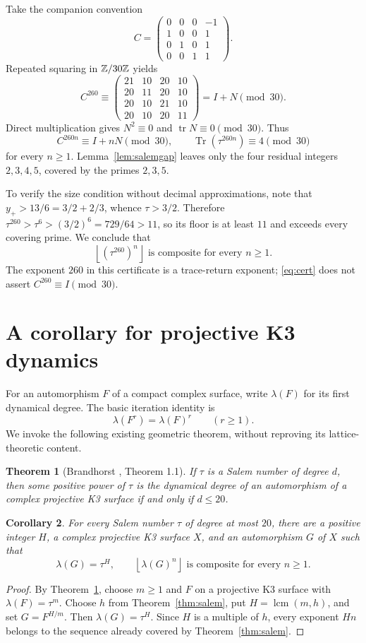 \documentclass[11pt,a4paper]{article}
\newtheorem{theorem}{Theorem}[section]
\newtheorem{corollary}[theorem]{Corollary}
\theoremstyle{definition}\newtheorem{definition}[theorem]{Definition}
\theoremstyle{remark}\newtheorem{remark}[theorem]{Remark}
\DeclareMathOperator{\Tr}{Tr}\DeclareMathOperator{\Norm}{N}\DeclareMathOperator{\trdeg}{trdeg}\DeclareMathOperator{\ord}{ord}\DeclareMathOperator{\lcm}{lcm}
\newcommand{\floor}[1]{\left\lfloor #1\right\rfloor}\newcommand{\ceil}[1]{\left\lceil #1\right\rceil}
\begin{document}
Take the companion convention
\[
 C=\begin{pmatrix}
 0&0&0&-1\\1&0&0&1\\0&1&0&1\\0&0&1&1
 \end{pmatrix}.
\]
Repeated squaring in $\mathbb Z/30\mathbb Z$ yields
\begin{equation}\label{eq:cert}
 C^{260}\equiv
 \begin{pmatrix}
 21&10&20&10\\20&11&20&10\\20&10&21&10\\20&10&20&11
 \end{pmatrix}=I+N\pmod {30}.
\end{equation}
Direct multiplication gives $N^2\equiv0$ and $\operatorname{tr}N\equiv0\pmod{30}$. Thus
\[
 C^{260n}\equiv I+nN\pmod {30},\qquad
 \Tr(\tau^{260n})\equiv4\pmod {30}
\]
for every $n\ge1$. Lemma~\ref{lem:salemgap} leaves only the four residual integers $2,3,4,5$, covered by the primes $2,3,5$.

To verify the size condition without decimal approximations, note that $y_+>13/6=3/2+2/3$, whence $\tau>3/2$. Therefore $\tau^{260}>\tau^6>(3/2)^6=729/64>11$, so its floor is at least $11$ and exceeds every covering prime. We conclude that
\[
 \floor{(\tau^{260})^n}\text{ is composite for every }n\ge1.
\]
The exponent $260$ in this certificate is a trace-return exponent; \eqref{eq:cert} does not assert $C^{260}\equiv I\pmod {30}$.

\section{A corollary for projective K3 dynamics}
For an automorphism $F$ of a compact complex surface, write $\lambda(F)$ for its first dynamical degree. The basic iteration identity is
\[
 \lambda(F^r)=\lambda(F)^r\qquad(r\ge1).
\]
We invoke the following existing geometric theorem, without reproving its lattice-theoretic content.

\begin{theorem}[Brandhorst \cite{Brandhorst}, Theorem 1.1]\label{thm:brand}
If $\tau$ is a Salem number of degree $d$, then some positive power of $\tau$ is the dynamical degree of an automorphism of a complex projective K3 surface if and only if $d\le20$.
\end{theorem}

\begin{corollary}\label{cor:k3}
For every Salem number $\tau$ of degree at most $20$, there are a positive integer $H$, a complex projective K3 surface $X$, and an automorphism $G$ of $X$ such that
\[
 \lambda(G)=\tau^H,\qquad
 \floor{\lambda(G)^n}\text{ is composite for every }n\ge1.
\]
\end{corollary}
\begin{proof}
By Theorem~\ref{thm:brand}, choose $m\ge1$ and $F$ on a projective K3 surface with $\lambda(F)=\tau^m$. Choose $h$ from Theorem~\ref{thm:salem}, put $H=\lcm(m,h)$, and set $G=F^{H/m}$. Then $\lambda(G)=\tau^H$. Since $H$ is a multiple of $h$, every exponent $Hn$ belongs to the sequence already covered by Theorem~\ref{thm:salem}.
\end{proof}
\end{document}
